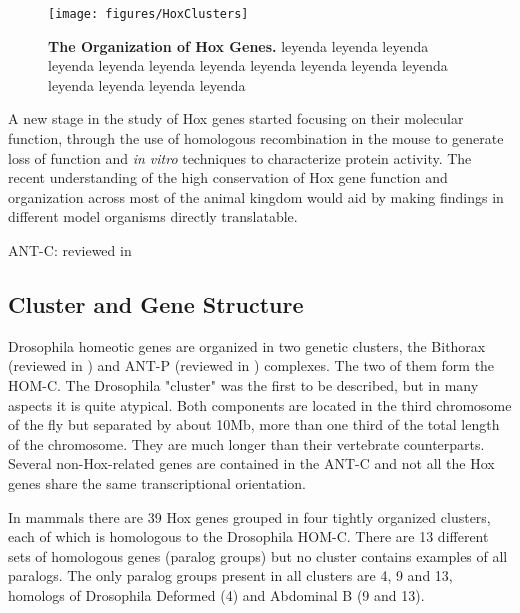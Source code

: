 \begin{figure}[]
  
  \centering
  \texttt{[image: figures/HoxClusters]}
  \caption[The Organization of Hox Genes]{\textbf{The Organization of Hox Genes.} leyenda leyenda leyenda leyenda leyenda leyenda leyenda leyenda leyenda leyenda leyenda leyenda leyenda leyenda leyenda}
  \label{fig:hoxclusters}
\end{figure}

A new stage in the study of Hox genes started focusing on their molecular function, through the use of homologous recombination in the mouse to generate loss of function and \textit{in vitro} techniques to characterize protein activity. The recent understanding of the high conservation of Hox gene function and organization across most of the animal kingdom would aid by making findings in different model organisms directly translatable. 




\ac{ANT-C}: reviewed in \cite{Kaufman1990}

\subsection{Cluster and Gene Structure}


Drosophila homeotic genes are organized in two genetic clusters, the  Bithorax (reviewed in \cite{Lewis1978}) and \ac{ANT-P} (reviewed in \cite{Kaufman1990}) complexes. The two of them form the \ac{HOM-C}. The Drosophila "cluster" was the first to be described, but in many aspects it is quite atypical. Both components are located in the third chromosome of the fly but separated by about 10Mb, more than one third of the total length of the chromosome. They are much longer than their vertebrate counterparts. Several non-Hox-related genes are contained in the \ac{ANT-C} and not all the Hox genes share the same transcriptional orientation. 

In mammals there are 39 Hox genes grouped in four tightly organized clusters, each of which is homologous to the Drosophila \ac{HOM-C}. There are 13 different sets of homologous genes (paralog groups) but no cluster contains examples of all paralogs. The only paralog groups present in all clusters are 4, 9 and 13, homologs of Drosophila Deformed (4) and Abdominal B (9 and 13). 

